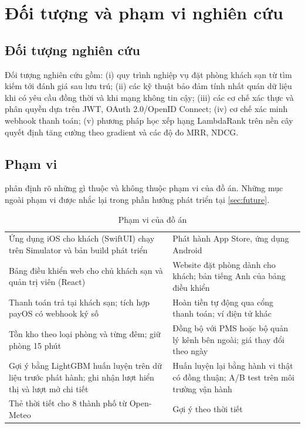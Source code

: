 \section{Đối tượng và phạm vi nghiên cứu}\label{sec:scope}

\subsection{Đối tượng nghiên cứu}

Đối tượng nghiên cứu gồm: (i) quy trình nghiệp vụ đặt phòng khách sạn từ tìm kiếm tới đánh giá sau lưu trú; (ii) các kỹ thuật bảo đảm tính nhất quán dữ liệu khi có yêu cầu đồng thời và khi mạng không tin cậy; (iii) các cơ chế xác thực và phân quyền dựa trên JWT, OAuth 2.0/OpenID Connect; (iv) cơ chế xác minh webhook thanh toán; (v) phương pháp học xếp hạng LambdaRank trên nền cây quyết định tăng cường theo gradient và các độ đo MRR, NDCG.

\subsection{Phạm vi}

 phân định rõ những gì thuộc và không thuộc phạm vi của đồ án. Những mục ngoài phạm vi được nhắc lại trong phần hướng phát triển tại \cref{sec:future}.

\begin{table}[H]
\centering
\caption{Phạm vi của đồ án}\label{tab:scope}
\begin{rtable}
\begin{tabular}{|L{7.6cm}|L{7.2cm}|}
\hline
{} &  \\ \hline
Ứng dụng iOS cho khách (SwiftUI) chạy trên Simulator và bản build phát triển & Phát hành App Store, ứng dụng Android \\ \hline
Bảng điều khiển web cho chủ khách sạn và quản trị viên (React) & Website đặt phòng dành cho khách; bản tiếng Anh của bảng điều khiển \\ \hline
Thanh toán trả tại khách sạn; tích hợp payOS có webhook ký số & Hoàn tiền tự động qua cổng thanh toán; ví điện tử khác \\ \hline
Tồn kho theo loại phòng và từng đêm; giữ phòng 15 phút & Đồng bộ với PMS hoặc bộ quản lý kênh bên ngoài; giá thay đổi theo ngày \\ \hline
Gợi ý bằng LightGBM huấn luyện trên dữ liệu trước phát hành; ghi nhận lượt hiển thị và lượt mở chi tiết & Huấn luyện lại bằng hành vi thật có đồng thuận; A/B test trên môi trường vận hành \\ \hline
Thẻ thời tiết cho 8 thành phố từ Open-Meteo & Gợi ý theo thời tiết \\ \hline
\end{tabular}
\end{rtable}
\end{table}

